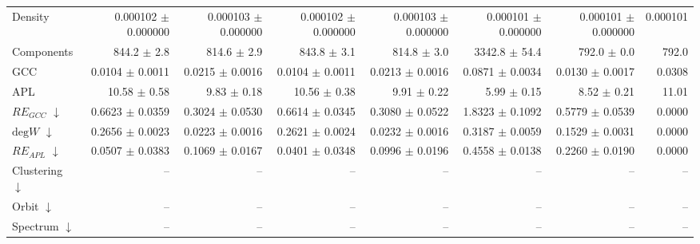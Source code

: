 \begin{table}[H]
\begin{tabular}{lrrrrrrr}
Density                       & 0.000102 $\pm$ 0.000000 & 0.000103 $\pm$ 0.000000 & 0.000102 $\pm$ 0.000000 & 0.000103 $\pm$ 0.000000 & 0.000101 $\pm$ 0.000000 & 0.000101 $\pm$ 0.000000 & 0.000101 \\
Components                    & 844.2 $\pm$ 2.8 & 814.6 $\pm$ 2.9 & 843.8 $\pm$ 3.1 & 814.8 $\pm$ 3.0 & 3342.8 $\pm$ 54.4 & 792.0 $\pm$ 0.0 & 792.0 \\
GCC                           & 0.0104 $\pm$ 0.0011 & 0.0215 $\pm$ 0.0016 & 0.0104 $\pm$ 0.0011 & 0.0213 $\pm$ 0.0016 & 0.0871 $\pm$ 0.0034 & 0.0130 $\pm$ 0.0017 & 0.0308 \\
APL                           & 10.58 $\pm$ 0.58 & 9.83 $\pm$ 0.18 & 10.56 $\pm$ 0.38 & 9.91 $\pm$ 0.22 & 5.99 $\pm$ 0.15 & 8.52 $\pm$ 0.21 & 11.01 \\
\midrule
$RE_{GCC}$ $\downarrow$       & 0.6623 $\pm$ 0.0359 & 0.3024 $\pm$ 0.0530 & 0.6614 $\pm$ 0.0345 & 0.3080 $\pm$ 0.0522 & 1.8323 $\pm$ 0.1092 & 0.5779 $\pm$ 0.0539 & 0.0000 \\
$\mathrm{deg}W$ $\downarrow$  & 0.2656 $\pm$ 0.0023 & 0.0223 $\pm$ 0.0016 & 0.2621 $\pm$ 0.0024 & 0.0232 $\pm$ 0.0016 & 0.3187 $\pm$ 0.0059 & 0.1529 $\pm$ 0.0031 & 0.0000 \\
$RE_{APL}$ $\downarrow$       & 0.0507 $\pm$ 0.0383 & 0.1069 $\pm$ 0.0167 & 0.0401 $\pm$ 0.0348 & 0.0996 $\pm$ 0.0196 & 0.4558 $\pm$ 0.0138 & 0.2260 $\pm$ 0.0190 & 0.0000 \\
Clustering $\downarrow$       & -- & -- & -- & -- & -- & -- & -- \\
Orbit $\downarrow$            & -- & -- & -- & -- & -- & -- & -- \\
Spectrum $\downarrow$         & -- & -- & -- & -- & -- & -- & -- \\
\bottomrule
\end{tabular}
\end{table}
